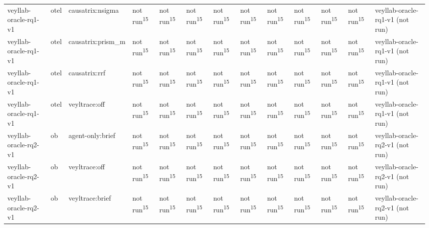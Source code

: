 \begin{table}[t]
\begin{tabular}{lllllllllllll}
veyllab-oracle-rq1-v1 & otel & causatrix:nsigma & not run\textsuperscript{15} & not run\textsuperscript{15} & not run\textsuperscript{15} & not run\textsuperscript{15} & not run\textsuperscript{15} & not run\textsuperscript{15} & not run\textsuperscript{15} & not run\textsuperscript{15} & not run\textsuperscript{15} & veyllab-oracle-rq1-v1 (not run) \\
veyllab-oracle-rq1-v1 & otel & causatrix:prism\_m & not run\textsuperscript{15} & not run\textsuperscript{15} & not run\textsuperscript{15} & not run\textsuperscript{15} & not run\textsuperscript{15} & not run\textsuperscript{15} & not run\textsuperscript{15} & not run\textsuperscript{15} & not run\textsuperscript{15} & veyllab-oracle-rq1-v1 (not run) \\
veyllab-oracle-rq1-v1 & otel & causatrix:rrf & not run\textsuperscript{15} & not run\textsuperscript{15} & not run\textsuperscript{15} & not run\textsuperscript{15} & not run\textsuperscript{15} & not run\textsuperscript{15} & not run\textsuperscript{15} & not run\textsuperscript{15} & not run\textsuperscript{15} & veyllab-oracle-rq1-v1 (not run) \\
veyllab-oracle-rq1-v1 & otel & veyltrace:off & not run\textsuperscript{15} & not run\textsuperscript{15} & not run\textsuperscript{15} & not run\textsuperscript{15} & not run\textsuperscript{15} & not run\textsuperscript{15} & not run\textsuperscript{15} & not run\textsuperscript{15} & not run\textsuperscript{15} & veyllab-oracle-rq1-v1 (not run) \\
veyllab-oracle-rq2-v1 & ob & agent-only:brief & not run\textsuperscript{15} & not run\textsuperscript{15} & not run\textsuperscript{15} & not run\textsuperscript{15} & not run\textsuperscript{15} & not run\textsuperscript{15} & not run\textsuperscript{15} & not run\textsuperscript{15} & not run\textsuperscript{15} & veyllab-oracle-rq2-v1 (not run) \\
veyllab-oracle-rq2-v1 & ob & veyltrace:off & not run\textsuperscript{15} & not run\textsuperscript{15} & not run\textsuperscript{15} & not run\textsuperscript{15} & not run\textsuperscript{15} & not run\textsuperscript{15} & not run\textsuperscript{15} & not run\textsuperscript{15} & not run\textsuperscript{15} & veyllab-oracle-rq2-v1 (not run) \\
veyllab-oracle-rq2-v1 & ob & veyltrace:brief & not run\textsuperscript{15} & not run\textsuperscript{15} & not run\textsuperscript{15} & not run\textsuperscript{15} & not run\textsuperscript{15} & not run\textsuperscript{15} & not run\textsuperscript{15} & not run\textsuperscript{15} & not run\textsuperscript{15} & veyllab-oracle-rq2-v1 (not run) \\

\end{tabular}
\end{table}
